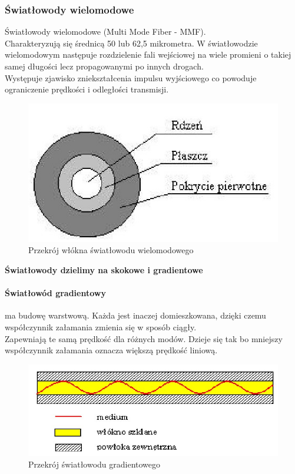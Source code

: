 \documentclass{article}
\begin{document}
\subsubsection{Światłowody wielomodowe}
Światłowody wielomodowe (Multi Mode Fiber - MMF).\\
Charakteryzują się średnicą 50 lub 62,5 mikrometra. W światłowodzie wielomodowym następuje rozdzielenie fali wejściowej na wiele promieni o takiej samej długości lecz propagowanymi po innych drogach.\\
Występuje zjawisko zniekształcenia impulsu wyjściowego co powoduje ograniczenie prędkości i odległości transmisji.\\
\begin{figure}[H]
    \centering
    \includegraphics[width=0.4\linewidth]{w03z03.jpg}
    \caption{Przekrój włókna światłowodu wielomodowego}
\end{figure}
\textbf{Światłowody dzielimy na skokowe i gradientowe}

\paragraph{Światłowód gradientowy} ma budowę warstwową. Każda jest inaczej domieszkowana, dzięki czemu współczynnik załamania zmienia się w sposób ciągły.\\
Zapewniają te samą prędkość dla różnych modów. Dzieje się tak bo mniejszy współczynnik załamania oznacza większą prędkość liniową.
\begin{figure}[H]
    \centering
    \includegraphics[width=0.6\linewidth]{w03z04.jpg}
    \caption{Przekrój światłowodu gradientowego}
\end{figure}
\newpage
\end{document}
